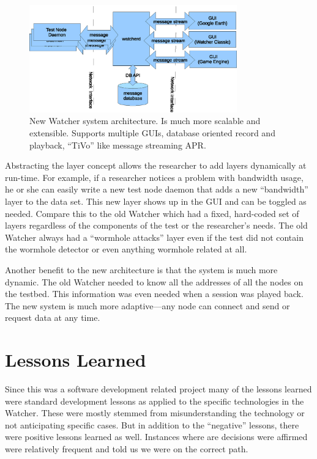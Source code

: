\documentclass{report}
\begin{document}
\begin{figure}[htb]
\centering
\includegraphics[width=0.8\textwidth]{watcherArch.eps}
\caption{New Watcher system architecture. Is much more scalable and extensible. Supports multiple GUIs, database oriented record and playback, ``TiVo'' like message streaming APR.} 
\label{fig:watcherArch}
\end{figure}

Abstracting the layer concept allows the researcher to add layers dynamically at run-time. For example, 
if a researcher notices a problem with bandwidth usage, he or she can easily write a new test node daemon that 
adds a new ``bandwidth'' layer to the data set. This new layer shows up in the GUI and can be toggled as needed. 
Compare this to the old Watcher which had a fixed, hard-coded set of layers regardless of the components of the test
or the researcher's needs. The old Watcher always had a ``wormhole attacks'' layer even if the test did not 
contain the wormhole detector or even anything wormhole related at all. 

Another benefit to the new architecture is that the system is much more dynamic. The old Watcher needed to know all the addresses of all the nodes
on the testbed. This information was even needed when a session was played back. The new system is much more adaptive---any node can connect and 
send or request data at any time. 

\section{Lessons Learned}
Since this was a software development related project many of the lessons learned were standard development lessons as applied to the 
specific technologies in the Watcher. These were mostly stemmed from misunderstanding the technology or not anticipating specific cases. 
But in addition to the ``negative'' lessons, there were positive lessons learned as well. Instances where are decisions were affirmed were
relatively frequent and told us we were on the correct path. 
\end{document}
